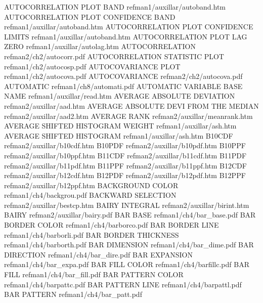 AUTOCORRELATION PLOT BAND               refman1/auxillar/autoband.htm
AUTOCORRELATION PLOT CONFIDENCE BAND    refman1/auxillar/autoband.htm
AUTOCORRELATION PLOT CONFIDENCE LIMITS  refman1/auxillar/autoband.htm
AUTOCORRELATION PLOT LAG ZERO           refman1/auxillar/autolag.htm
AUTOCORRELATION                         refman2/ch2/autocorr.pdf
AUTOCORRELATION STATISTIC PLOT          refman1/ch2/autocosp.pdf
AUTOCOVARIANCE PLOT                     refman1/ch2/autocova.pdf
AUTOCOVARIANCE                          refman2/ch2/autocova.pdf
AUTOMATIC                               refman1/ch8/automati.pdf
AUTOMATIC VARIABLE BASE NAME            refman1/auxillar/read.htm
AVERAGE ABSOLUTE DEVIATION              refman2/auxillar/aad.htm
AVERAGE ABSOLUTE DEVI FROM THE MEDIAN   refman2/auxillar/aad2.htm
AVERAGE RANK                            refman2/auxillar/meanrank.htm
AVERAGE SHIFTED HISTOGRAM WEIGHT        refman1/auxillar/ash.htm
AVERAGE SHIFTED HISTOGRAM               refman1/auxillar/ash.htm
B10CDF                                  refman2/auxillar/b10cdf.htm
B10PDF                                  refman2/auxillar/b10pdf.htm
B10PPF                                  refman2/auxillar/b10ppf.htm
B11CDF                                  refman2/auxillar/b11cdf.htm
B11PDF                                  refman2/auxillar/b11pdf.htm
B11PPF                                  refman2/auxillar/b11ppf.htm
B12CDF                                  refman2/auxillar/b12cdf.htm
B12PDF                                  refman2/auxillar/b12pdf.htm
B12PPF                                  refman2/auxillar/b12ppf.htm
BACKGROUND COLOR                        refman1/ch4/backgrou.pdf
BACKWARD SELECTION                      refman2/auxillar/bestcp.htm
BAIRY INTEGRAL                          refman2/auxillar/birint.htm
BAIRY                                   refman2/auxillar/bairy.pdf
BAR BASE                                refman1/ch4/bar_base.pdf
BAR BORDER COLOR                        refman1/ch4/barborco.pdf
BAR BORDER LINE                         refman1/ch4/barborli.pdf
BAR BORDER THICKNESS                    refman1/ch4/barborth.pdf
BAR DIMENSION                           refman1/ch4/bar_dime.pdf
BAR DIRECTION                           refman1/ch4/bar_dire.pdf
BAR EXPANSION                           refman1/ch4/bar_expa.pdf
BAR FILL COLOR                          refman1/ch4/barfillc.pdf
BAR FILL                                refman1/ch4/bar_fill.pdf
BAR PATTERN COLOR                       refman1/ch4/barpattc.pdf
BAR PATTERN LINE                        refman1/ch4/barpattl.pdf
BAR PATTERN                             refman1/ch4/bar_patt.pdf
